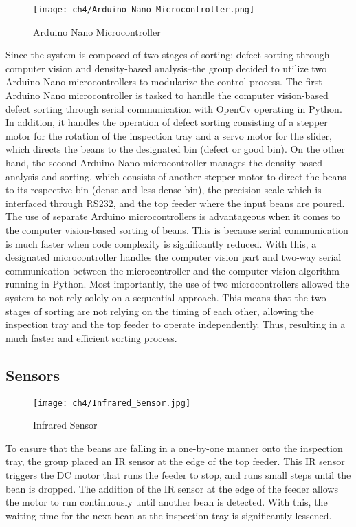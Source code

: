 \begin{figure}[H]
    \centering
    \texttt{[image: ch4/Arduino\_Nano\_Microcontroller.png]} %
    \caption{Arduino Nano Microcontroller}
    \label{fig:arduino_nano}
\end{figure}

Since the system is composed of two stages of sorting: defect sorting through computer vision and density-based analysis–the group decided to utilize two Arduino Nano microcontrollers to modularize the control process. The first Arduino Nano microcontroller is tasked to handle the computer vision-based defect sorting through serial communication with OpenCv operating in Python. In addition, it handles the operation of defect sorting consisting of a stepper motor for the rotation of the inspection tray and a servo motor for the slider, which directs the beans to the designated bin (defect or good bin). On the other hand, the second Arduino Nano microcontroller manages the density-based analysis and sorting, which consists of another stepper motor to direct the beans to its respective bin (dense and less-dense bin), the precision scale which is interfaced through RS232, and the top feeder where the input beans are poured. The use of separate Arduino microcontrollers is advantageous when it comes to the computer vision-based sorting of beans. This is because serial communication is much faster when code complexity is significantly reduced. With this, a designated microcontroller handles the computer vision part and two-way serial communication between the microcontroller and the computer vision algorithm running in Python. Most importantly, the use of two microcontrollers allowed the system to not rely solely on a sequential approach. This means that the two stages of sorting are not relying on the timing of each other, allowing the inspection tray and the top feeder to operate independently. Thus, resulting in a much faster and efficient sorting process. 

\subsection{Sensors}

\begin{figure}[H]
    \centering
    \texttt{[image: ch4/Infrared\_Sensor.jpg]} %
    \caption{Infrared Sensor}
    \label{fig:infrared_sensor}
\end{figure}

To ensure that the beans are falling in a one-by-one manner onto the inspection tray, the group placed an IR sensor at the edge of the top feeder. This IR sensor triggers the DC motor that runs the feeder to stop, and runs small steps until the bean is dropped. The addition of the IR sensor at the edge of the feeder allows the motor to run continuously until another bean is detected. With this, the waiting time for the next bean at the inspection tray is significantly lessened. 

